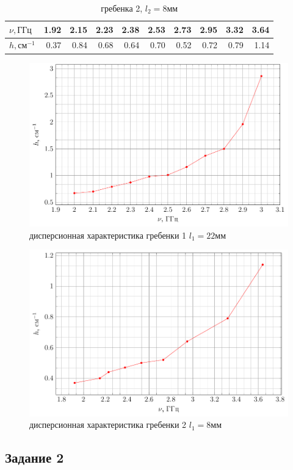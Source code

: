 \documentclass[a4paper,14pt]{extarticle}
\begin{document}
\begin{table}[htbp]
	\centering
	\caption{гребенка 2, $l_2 =8 \text{мм}$}
	\begin{tabular}{|l|r|r|r|r|r|r|r|r|r|}
		\hline
		$\nu, \text{ГГц}$ & 1.92  & 2.15  & 2.23  & 2.38  & 2.53  & 2.73  & 2.95  & 3.32  & 3.64 \\
		\hline
		$h, \text{см}^{-1}$ & 0.37  & 0.84  & 0.68  & 0.64  & 0.70  & 0.52  & 0.72  & 0.79  & 1.14 \\
		\hline
	\end{tabular}%
	\label{tab:addlabel}%
\end{table}%

\begin{figure}[H]
	\centering
	\includegraphics[width=0.8\linewidth]{plots/task1_1}
	\caption{дисперсионная характеристика гребенки 1 $l_1=22 \text{мм}$}
	\label{task1_1}
\end{figure}
\begin{figure}[H]
	\centering
	\includegraphics[width=0.8\linewidth]{plots/task1_2}
	\caption{дисперсионная характеристика гребенки 2 $l_1=8 \text{мм}$}
	\label{task1_2}
\end{figure}
\newpage
\subsection*{Задание 2}
\end{document}
